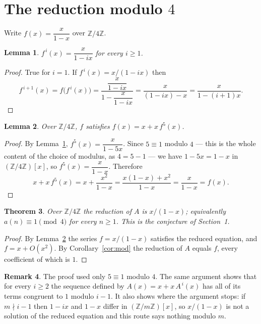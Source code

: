 \documentclass[11pt,a4paper]{article}
\theoremstyle{plain}
\newtheorem{theorem}{Theorem}
\newtheorem{lemma}[theorem]{Lemma}
\theoremstyle{definition}
\newtheorem{remark}[theorem]{Remark}
\begin{document}
\section{The reduction modulo $4$}

Write $f(x)=\dfrac{x}{1-x}$ over $\mathbb{Z}/4\mathbb{Z}$.

\begin{lemma}\label{lem:iter}
$f^{\,i}(x)=\dfrac{x}{1-ix}$ for every $i\ge1$.
\end{lemma}

\begin{proof}
True for $i=1$. If $f^{\,i}(x)=x/(1-ix)$ then
\[
f^{\,i+1}(x)=f\bigl(f^{\,i}(x)\bigr)
=\frac{\dfrac{x}{1-ix}}{1-\dfrac{x}{1-ix}}
=\frac{x}{(1-ix)-x}=\frac{x}{1-(i+1)x} .
\]
\end{proof}

\begin{lemma}\label{lem:sat}
Over $\mathbb{Z}/4\mathbb{Z}$, $f$ satisfies $f(x)=x+x\,f^{5}(x)$.
\end{lemma}

\begin{proof}
By Lemma~\ref{lem:iter}, $f^{5}(x)=\dfrac{x}{1-5x}$. Since $5\equiv1$ modulo
$4$ --- this is the whole content of the choice of modulus, as $4=5-1$ --- we have
$1-5x=1-x$ in $(\mathbb{Z}/4\mathbb{Z})[x]$, so $f^{5}(x)=\dfrac{x}{1-x}$.
Therefore
\[
x+x\,f^{5}(x)=x+\frac{x^{2}}{1-x}
=\frac{x(1-x)+x^{2}}{1-x}=\frac{x}{1-x}=f(x).
\]
\end{proof}

\begin{theorem}\label{thm:main}
Over $\mathbb{Z}/4\mathbb{Z}$ the reduction of $A$ is $x/(1-x)$; equivalently
$a(n)\equiv1\pmod{4}$ for every $n\ge1$. This is the conjecture of Section~1.
\end{theorem}

\begin{proof}
By Lemma~\ref{lem:sat} the series $f=x/(1-x)$ satisfies the reduced equation, and
$f=x+O(x^{2})$. By Corollary~\ref{cor:mod} the reduction of $A$ equals $f$, every
coefficient of which is $1$.
\end{proof}

\begin{remark}
The proof used only $5\equiv1$ modulo $4$. The same argument shows that for every
$i\ge2$ the sequence defined by $A(x)=x+x\,A^{\,i}(x)$ has all of its terms congruent to
$1$ modulo $i-1$. It also shows where the argument stops: if $m\nmid i-1$ then $1-ix$ and
$1-x$ differ in $(\mathbb{Z}/m\mathbb{Z})[x]$, so $x/(1-x)$ is not a solution of the
reduced equation and this route says nothing modulo $m$.
\end{remark}
\end{document}
